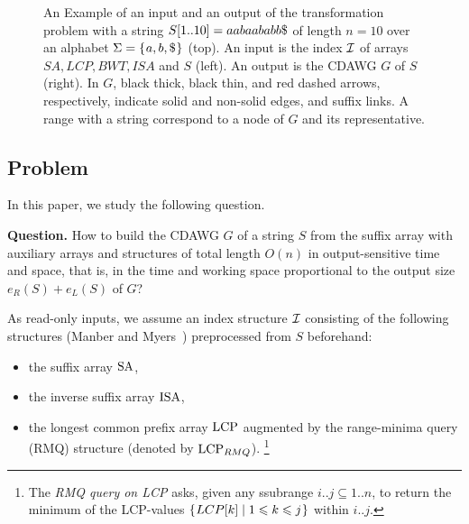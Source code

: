\begin{figure}[t]
\begin{minipage}[c]{0.44\textwidth}
\centering
{}
\end{minipage}
\hspace{20mm}
\begin{minipage}[c]{0.44\textwidth}
\centering
{}
\end{minipage}
\caption{An Example of an input and an output of the transformation problem with a string $S[1..10] = aabaababb\daller$ of length $n = 10$ over an alphabet $\Sigma = \{\kern0.05ema, b, \$\kern0.05em\}$ (top).
  An input is the index $\mathcal{I}$ of arrays $SA, LCP, BWT, ISA$ and $S$ (left). An output is the CDAWG $G$ of $S$ (right).
  In $G$, black thick, black thin, and red dashed arrows, respectively, indicate solid and non-solid edges, and suffix links.
  A range with a string correspond to a node of $G$ and its representative. 
}\label{fig:example:problem}
\end{figure}


\subsection{Problem}
In this paper, 
we study the following question. 

\vspace{-0.25\baselineskip}
\begin{trivlist}{\item[] \noindent \textbf{Question.}
How to build the CDAWG $G$ of a string $S$ from the suffix array with auxiliary arrays and structures of total length $O(n)$ in output-sensitive time and space, that is, in the time and working space proportional to the output size ${e_R(S) + e_L(S)}$ of $G$?
}\end{trivlist}
\vspace{-0.25\baselineskip}


As read-only inputs, we assume an index structure $\mathcal{I}$ consisting of the following structures (Manber and Myers~\cite{manber:myers1993suffixarrays}) preprocessed from $S$ beforehand: 
\begin{itemize}
\item the suffix array $\mathrm{SA}$,
\item the inverse suffix array $\mathrm{ISA}$,
\item the longest common prefix array $\mathrm{LCP}$ augmented by the range-minima query (RMQ) structure (denoted by $\mathrm{LCP}_{RMQ}$).%
\footnote{
The \textit{RMQ query on LCP} asks, given any ssubrange $i..j \subseteq 1..n$, to return the minimum of the LCP-values $\{\kern0.05emLCP[k] \mid 1\leqslant k\leqslant j\kern0.05em\}$ within $i..j$.
}
\end{itemize}


